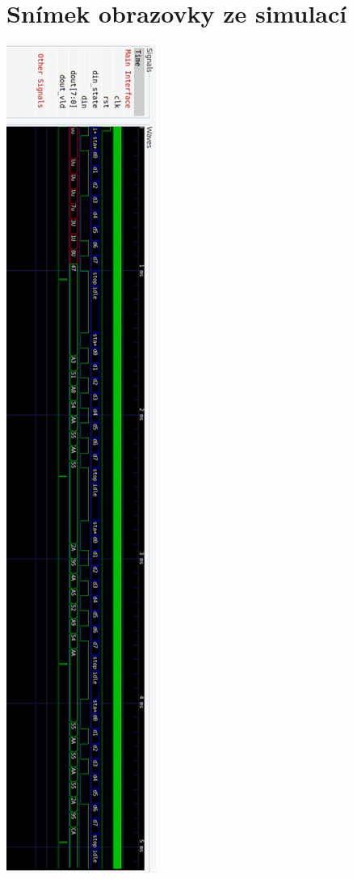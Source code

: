 \documentclass[a4paper, 11pt]{article}
\begin{document}
\section{Snímek obrazovky ze simulací}
\begin{center}
  \includegraphics[width=0.4\textheight,height=1.475\textwidth]{wave.pdf}
\end{center}
\end{document}
